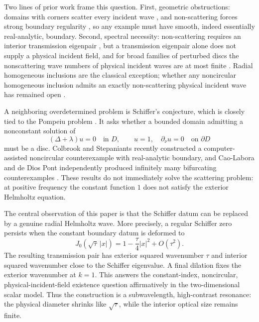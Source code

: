 \documentclass[11pt]{amsart}
\newcommand{\abs}[1]{\left\lvert #1\right\rvert}
\begin{document}
Two lines of prior work frame this question.  First, geometric
obstructions: domains with corners scatter every incident wave
\cite{BlastenPaivarintaSylvester2014,PaivarintaSaloVesalainen2017,
ElschnerHu2015}, and non-scattering forces strong boundary regularity
\cite{SaloShahgholian2021,CakoniVogelius2023,CakoniVogeliusXiao2023}, so
any example must have smooth, indeed essentially real-analytic, boundary.
Second, spectral necessity: non-scattering requires an interior
transmission eigenpair \cite{Kirsch1986,ColtonMonk1988,
CakoniColtonHaddar2016}, but a transmission eigenpair alone does not supply
a physical incident field, and for broad families of perturbed discs the
nonscattering wave numbers of physical incident waves are at most finite
\cite{VogeliusXiao2021,HovsepyanVogelius2025}.  Radial homogeneous
inclusions are the classical exception; whether any noncircular homogeneous
inclusion admits an exactly non-scattering physical incident wave has
remained open \cite{CakoniVogelius2026}.

A neighboring overdetermined problem is Schiffer's conjecture, which is
closely tied to the Pompeiu problem
\cite{Pompeiu1929,BrownSchreiberTaylor1973,Williams1976,Berenstein1980}.
It asks whether a bounded domain admitting a nonconstant solution of
\begin{equation}\label{eq:schiffer-intro}
  (\Delta+\lambda)u=0\quad\text{in }D,
  \qquad
  u=1,
  \quad
  \partial_\nu u=0
  \quad\text{on }\partial D
\end{equation}
must be a disc.  Colbrook and Stepaniants recently constructed a
computer-assisted noncircular counterexample with real-analytic boundary,
and Cao-Labora and de Dios Pont independently produced infinitely many
bifurcating counterexamples
\cite{ColbrookStepaniants2026,CaoLaboraDeDiosPont2026}.  These results do not
immediately solve the scattering problem: at positive frequency the constant
function $1$ does not satisfy the exterior Helmholtz equation.

The central observation of this paper is that the Schiffer datum can be
replaced by a genuine radial Helmholtz wave.  More precisely, a regular
Schiffer zero persists when the constant boundary datum is deformed to
\[
  J_0(\sqrt\tau\,\abs{x})=1-\frac\tau4\abs{x}^2+O(\tau^2).
\]
The resulting transmission pair has exterior squared wavenumber $\tau$ and
interior squared wavenumber close to the Schiffer eigenvalue.  A final
dilation fixes the exterior wavenumber at $k=1$.  This answers the
constant-index, noncircular, physical-incident-field existence question
affirmatively in the two-dimensional scalar model.  Thus the construction is a
subwavelength, high-contrast resonance: the physical diameter shrinks like
$\sqrt\tau$, while the interior optical size remains finite.
\end{document}
